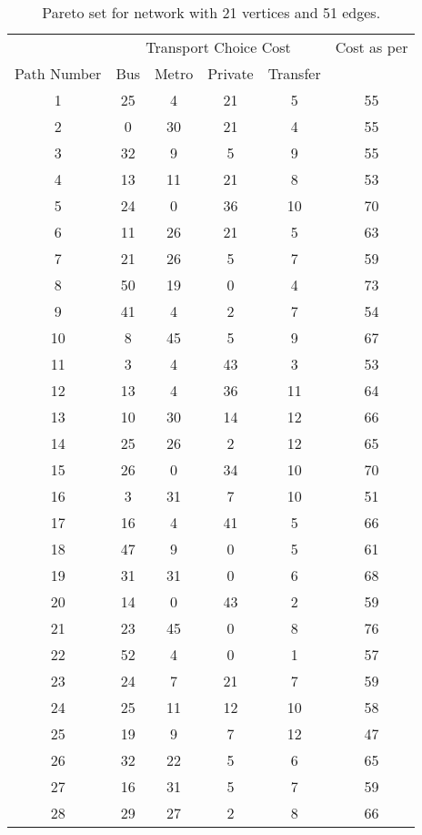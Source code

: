 \documentclass[preprint,authoryear,12pt]{elsarticle}
\begin{document}
\begin{table}
\caption{Pareto set for network with 21 vertices and 51
edges.}\label{tab:a} \vspace{-0.1 cm}
\begin{center}\begin{scriptsize}
\begin{tabular}{|c|cccc|c|}\hline
    & \multicolumn{4}{c|}{Transport Choice Cost}& Cost as per\\ \cline{2-5}
Path Number & Bus & Metro & Private & Transfer & {\tiny{\cite{Lozano2001}}}\\ \hline
  1 & 25 & 4  & 21 & 5  & 55 \\
  2 & 0  & 30 & 21 & 4  & 55 \\
  3 & 32 & 9  & 5  & 9  & 55 \\
  4 & 13 & 11 & 21 & 8  & 53 \\
  5 & 24 & 0  & 36 & 10 & 70 \\
  6 & 11 & 26 & 21 & 5  & 63 \\
  7 & 21 & 26 & 5  & 7  & 59 \\
  8 & 50 & 19 & 0  & 4  & 73 \\
  9 & 41 & 4  & 2  & 7  & 54 \\
 10 & 8  & 45 & 5  & 9  & 67 \\
 11 & 3  & 4  & 43 & 3  & 53 \\
 12 & 13 & 4  & 36 & 11 & 64 \\
 13 & 10 & 30 & 14 & 12 & 66 \\
 14 & 25 & 26 & 2  & 12 & 65 \\
 15 & 26 & 0  & 34 & 10 & 70 \\
 16 & 3  & 31 & 7  & 10 & 51 \\
 17 & 16 & 4  & 41 & 5  & 66 \\
 18 & 47 & 9  & 0  & 5  & 61 \\
 19 & 31 & 31 & 0  & 6  & 68 \\
 20 & 14 & 0  & 43 & 2  & 59 \\
 21 & 23 & 45 & 0  & 8  & 76 \\
 22 & 52 & 4  & 0  & 1  & 57 \\
 23 & 24 & 7  & 21 & 7  & 59 \\
 24 & 25 & 11 & 12 & 10 & 58 \\
 25 & 19 & 9  & 7  & 12 & 47 \\
 26 & 32 & 22 & 5  & 6  & 65 \\
 27 & 16 & 31 & 5  & 7  & 59 \\
 28 & 29 & 27 & 2  & 8  & 66 \\

\end{tabular}
\end{scriptsize}
\end{center}
\end{table}
\end{document}
